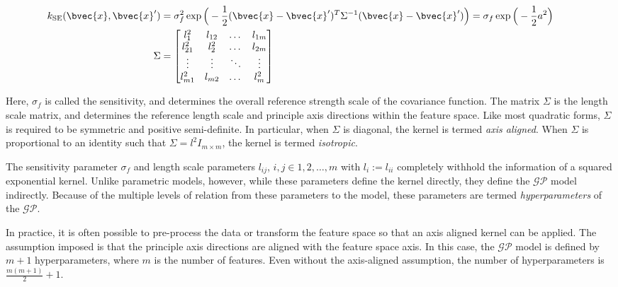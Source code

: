 			\begin{equation}
				\left.
					\begin{aligned}
						k_{\mathrm{SE}}(\bvec{x}, \bvec{x}') &= \sigma_{f}^{2} \exp\Big(-\frac{1}{2}(\bvec{x} - \bvec{x}')^{T} \Sigma^{-1} (\bvec{x} - \bvec{x}')\Big) = \sigma_{f} \exp\Big(-\frac{1}{2} a^{2} \Big) \\
						\Sigma &= 	\begin{bmatrix}
										l_{1}^{2} & l_{12} & \dots & l_{1m} \\
										l_{21}^{2} & l_{2}^{2} & \dots & l_{2m} \\
										\vdots & \vdots  & \ddots & \vdots \\
										l_{m1}^{2} & l_{m2} & \dots & l_{m}^{2} \\
								  	\end{bmatrix}
					\end{aligned}
				\qquad \right.
			\label{Background:GaussianProcess:Equation:SquaredExponentialKernel}
			\end{equation}
			
			Here, $\sigma_{f}$ is called the sensitivity, and determines the overall reference strength scale of the covariance function. The matrix $\Sigma$ is the length scale matrix, and determines the reference length scale and principle axis directions within the feature space. Like most quadratic forms, $\Sigma$ is required to be symmetric and positive semi-definite. In particular, when $\Sigma$ is diagonal, the kernel is termed \textit{axis aligned}. When $\Sigma$ is proportional to an identity such that $\Sigma = l^{2} I_{m \times m}$, the kernel is termed \textit{isotropic}.
			
			The sensitivity parameter $\sigma_{f}$ and length scale parameters $l_{ij}$, $i, j \in {1, 2, \dots, m}$ with $l_{i} := l_{ii}$ completely withhold the information of a squared exponential kernel. Unlike parametric models, however, while these parameters define the kernel directly, they define the $\mathcal{GP}$ model indirectly. Because of the multiple levels of relation from these parameters to the model, these parameters are termed \textit{hyperparameters} of the $\mathcal{GP}$.
			
			In practice, it is often possible to pre-process the data or transform the feature space so that an axis aligned kernel can be applied. The assumption imposed is that the principle axis directions are aligned with the feature space axis. In this case, the $\mathcal{GP}$ model is defined by $m + 1$ hyperparameters, where $m$ is the number of features. Even without the axis-aligned assumption, the number of hyperparameters is $\frac{m(m + 1)}{2} + 1$.
			
